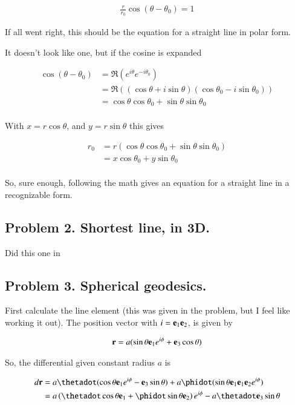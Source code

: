 \begin{align*}
\frac{r}{r_0} \cos(\theta - \theta_0) = 1
\end{align*}
 
If all went right, this should be the equation for a straight line in polar form.

It doesn't look like one, but if the cosine is expanded 

\begin{align*}
\cos(\theta - \theta_0) 
&= \Re\left( e^{i\theta}e^{-i\theta_0} \right) \\
&= \Re\left( (\cos\theta + i\sin\theta)(\cos\theta_0 - i\sin\theta_0) \right) \\
&= \cos\theta\cos\theta_0 + \sin\theta\sin\theta_0 \\
\end{align*}

With $x = r\cos\theta$, and $y = r\sin\theta$ this gives

\begin{align*}
r_0 
&= r \left( \cos\theta\cos\theta_0 + \sin\theta\sin\theta_0 \right) \\
&= x \cos\theta_0 + y\sin\theta_0 \\
\end{align*}

So, sure enough, following the math gives an equation for a straight line in a recognizable form.

\subsection{Problem 2. Shortest line, in 3D. }

Did this one in 

\subsection{Problem 3.  Spherical geodesics. }

First calculate the line element (this was given in the problem, but I feel like working it out).
The position vector with $i = \mathbf{e}_1 \mathbf{e}_2$, is given by

\begin{align*}
\mathbf{r} = a ( \sin\theta \mathbf{e}_1 e^{i\phi} + \mathbf{e}_3 \cos\theta )
\end{align*}

So, the differential given constant radius $a$ is

\begin{align*}
d\Br 
&= 
a \thetadot ( \cos\theta \Be_1 e^{i\phi} - \Be_3 \sin\theta )
+ a \phidot ( \sin\theta \Be_1 \Be_1 \Be_2 e^{i\phi} ) \\
&= 
a \left( \thetadot \cos\theta \Be_1 + \phidot \sin\theta \Be_2 \right) e^{i\phi} - a \thetadot \Be_3 \sin\theta \\
\end{align*}

